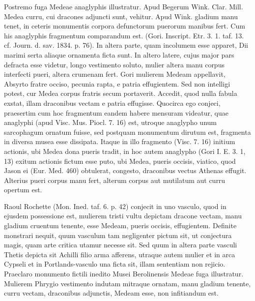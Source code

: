 \documentclass[landscape, a4paper, 11pt, oneside, polutonikogreek, german]{article}
\begin{document}
Postremo fuga Medeae anaglyphis illustratur. Apud Begerum Wink. Clar. Mill. Medea curru, cui dracones adjuncti sunt, vehitur. Apud Wink. gladium manu tenet, in ceteris monumentis corpora defunctorum puerorum manibus fert. Cum his anaglyphis fragmentum comparandum est. (Gori. Inscript. Etr. 3. 1. taf. 13. cf. Journ. d. sav. 1834. p. 76). In altera parte, quam incolumem esse apparet, Dii marimi serta aliaque ornamenta ficta sunt. In altero latere, cujus major pars defracta esse videtur, longo vestimento soluto, mulier altera manu corpus interfecti pueri, altera crumenam fert. Gori mulierem Medeam appellavit, Absyrto fratre occiso, pecunia rapta, e patria effugientem. Sed non intelligi potest, cur Medea corpus fratris secum portaverit. Accedit, quod nulla fabula exstat, illam draconibus vectam e patria effugisse. Quocirca ego conjeci, praesertim cum hoc fragmentum eandem habere mensuram videatur, quae anaglyphi (apud Visc. Mus. Piocl. 7. 16) est, utroque anaglypho unum sarcophagum ornatum fuisse, sed postquam monumentum dirutum est, fragmenta in diversa musea esse dissipata. Itaque in illo fragmento (Visc. 7. 16) initium actionis, ubi Medea dona pueris tradit, in hoc autem anaglypho (Gori I. E. 3. 1, 13) exitum actionis fictum esse puto, ubi Medea, pueris occisis, viatico, quod Jason ei (Eur. Med. 460) obtulerat, congesto, draconibus vectus Athenas effugit. Alterius pueri corpus manu fert, alterum corpus aut mutilatum aut curru opertum est.

Raoul Rochette (Mon. Ined. taf. 6. p. 42) conjecit in uno vasculo, quod in ejusdem possessione est, mulierem tristi vultu depictam dracone vectam, manu gladium cruentum tenente, esse Medeam, pueris occisis, effugientem. Definite monstrari nequit, quum vasculum tam negligenter pictum sit, ut conjectura magis, quam arte critica utamur necesse sit. Sed quum in altera parte vasculi Thetis depicta sit Achilli filio arma afferens, utraque autem mulier et in arca Cypseli et in Portlands-vasculo una ficta sit, illam sententiam non rejicio. Praeclaro monumento fictili inedito Musei Berolinensis Medeae fuga illustratur. Mulierem Phrygio vestimento indutam mitraque ornatam, manu gladium tenente, curru vectam, draconibus adjunctis, Medeam esse, non infitiandum est.
\end{document}
